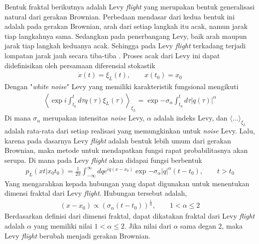 \par Bentuk fraktal berikutnya adalah Levy \textit{flight} yang merupakan bentuk generalisasi natural dari gerakan Brownian. Perbedaan mendasar dari kedua bentuk ini adalah pada gerakan Brownian, arah dari setiap langkah itu acak, namun jarak tiap langkahnya sama. Sedangkan pada penerbangang Levy, baik arah maupun jarak tiap langkah keduanya acak. Sehingga pada Levy \textit{flight} terkadang terjadi lompatan jarak jauh secara tiba-tiba \cite{Viswanathan2008Levy}. Proses acak dari Levy ini dapat didefinisikan oleh persamaan diferensial stokastik
\begin{align}
    \dot{x}(t) = \xi_L(t), \qquad x(t_0) = x_0
\end{align}
Dengan "\textit{white noise}" Levy yang memiliki karakteristik fungsional mengikuti
\begin{align}
    \left\langle\exp{i\int_{t_0}^t d\tau q(\tau)\xi_L(\tau)}\right\rangle_{\xi_L} = \exp{-\sigma_\alpha \int_{t_0}^t d\tau |q(\tau)|^\alpha}
\end{align}
Di mana \(\sigma_\alpha\) merupakan intensitas \textit{noise} Levy, \(\alpha\) adalah indeks Levy, dan \(\langle ...\rangle_{\xi_L}\) adalah rata-rata dari setiap realisasi yang memungkinkan untuk \textit{noise} Levy. Lalu, karena pada dasarnya Levy \textit{flight} adalah bentuk lebih umum dari gerakan Brownian, maka metode untuk mendapatkan fungsi rapat probabilitasnya akan serupa. Di mana pada Levy \textit{flight} akan didapai fungsi berbentuk
\begin{align}
    p_L(xt|x_0t_0) = \frac{1}{2\pi}\int_{-\infty}^{\infty}dqe^{iq(x-x_0)}\exp{-\sigma_\alpha |q|^\alpha (t-t_0)}, \qquad t>t_0
\end{align}
Yang mengarahkan kepada hubungan yang dapat digunakan untuk menentukan dimensi fraktal dari Levy \textit{flight}. Hubungan tersebut adalah,
\begin{align}
    (x-x_0) \propto (\sigma_\alpha (t-t_0))^\frac{1}{\alpha}, \qquad 1<\alpha\leq 2
\end{align}
Berdasarkan definisi dari dimensi fraktal, dapat dikatakan fraktal dari Levy \textit{flight} adalah \(\alpha\) yang memiliki nilai \(1<\alpha\leq 2\). Jika nilai dari \(\alpha\) sama degan 2, maka Levy \textit{flight} berubah menjadi gerakan Brownian. \cite{Laskin2018Fractional}

